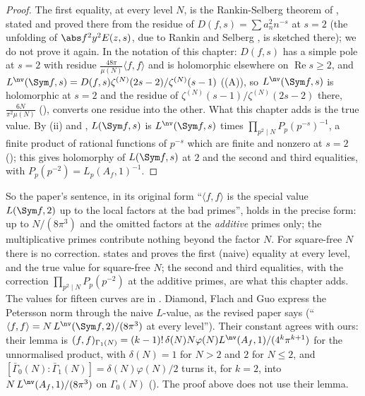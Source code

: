 \begin{proof}
The first equality, at every level $N$, is the Rankin-Selberg theorem of , stated and proved there from the residue of $D(f,s)=\sum a_n^2n^{-s}$ at $s=2$
(the unfolding of $\abs f^2y^2E(z,s)$, due to Rankin \cite{Rankin39} and Selberg \cite{Selberg40}, is sketched there); we do not prove it again. In the notation of this
chapter: $D(f,s)$ has a simple pole at $s=2$ with residue $\frac{48\pi}{\mu(N)}\langle f,f\rangle$ and is holomorphic elsewhere on $\operatorname{Re}s\ge2$, and
$L^{\nv}(\Sym f,s)=D(f,s)\zeta^{(N)}(2s-2)/\zeta^{(N)}(s-1)$ ((A)), so $L^{\nv}(\Sym f,s)$ is holomorphic at $s=2$ and the residue of
$\zeta^{(N)}(s-1)/\zeta^{(N)}(2s-2)$ there, $\frac{6N}{\pi^2\mu(N)}$ (), converts one residue into the other. What this chapter adds is the true value. By
(ii) and , $L(\Sym f,s)$ is $L^{\nv}(\Sym f,s)$ times $\prod_{p^2\mid N}P_p(p^{-s})^{-1}$, a finite product of rational functions of
$p^{-s}$ which are finite and nonzero at $s=2$ (); this gives holomorphy of $L(\Sym f,s)$ at $2$ and the second and third equalities, with
$P_p(p^{-2})=L_p(A_f,1)^{-1}$.
\end{proof}

So the paper's sentence, in its original form ``$\langle f,f\rangle$ is the special value $L(\Sym f,2)$ up to the local factors at the bad primes'', holds in the
precise form: up to $N/(8\pi^3)$ and the omitted factors at the \emph{additive} primes only; the multiplicative primes contribute nothing beyond the factor $N$. For
square-free $N$ there is no correction.  states and proves the first (naive) equality at every level, and the true value for square-free $N$; the
second and third equalities, with the correction $\prod_{p^2\mid N}P_p(p^{-2})$ at the additive primes, are what this chapter adds. The values for fifteen curves are in . Diamond, Flach and Guo
\cite[Lemma 2.12]{DFG04} express the Petersson norm through the naive $L$-value, as the revised paper says (``$\langle f,f\rangle=N\,L^{\nv}(\Sym f,2)/(8\pi^3)$ at every level''). Their constant agrees
with ours: their lemma is $(f,f)_{\Gamma_1(N)}=(k-1)!\,\delta(N)N\varphi(N)L^{\nv}(A_f,1)/(4^k\pi^{k+1})$ for the unnormalised product, with $\delta(N)=1$ for $N>2$ and $2$ for $N\le2$, and
$[\bar\Gamma_0(N):\bar\Gamma_1(N)]=\delta(N)\varphi(N)/2$ turns it, for $k=2$, into $N\,L^{\nv}(A_f,1)/(8\pi^3)$ on $\Gamma_0(N)$ (). The proof above does not use their lemma.

